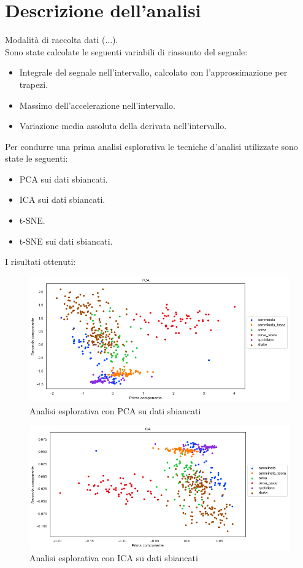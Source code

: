 \documentclass[./main.tex]{subfiles}
\begin{document}
\section{Descrizione dell'analisi}
Modalità di raccolta dati (...).
\\
Sono state calcolate le seguenti variabili di riassunto del segnale:
\begin{itemize}
	\item Integrale del segnale nell'intervallo, calcolato con l'approssimazione per trapezi.
	\item Massimo dell'accelerazione nell'intervallo.
	\item Variazione media assoluta della derivata nell'intervallo.
\end{itemize}
Per condurre una prima analisi esplorativa le tecniche d'analisi utilizzate sono state le seguenti:
\begin{itemize}
	\item PCA sui dati sbiancati.
	\item ICA sui dati sbiancati.
	\item t-SNE.
	\item t-SNE sui dati sbiancati.
\end{itemize}
I risultati ottenuti:
\begin{figure}[H]
	\centering
	\includegraphics[width=.9\textwidth, height=.9\textheight, keepaspectratio]{../../figure/PCA.png}
	\caption{{ Analisi esplorativa con PCA su dati sbiancati}}
	\label{PCA}
\end{figure}

\begin{figure}[H]
	\centering
	\includegraphics[width=.9\textwidth, height=.9\textheight, keepaspectratio]{../../figure/ICA.png}
	\caption{{ Analisi esplorativa con ICA su dati sbiancati}}
	\label{ICA}
\end{figure}
\end{document}
